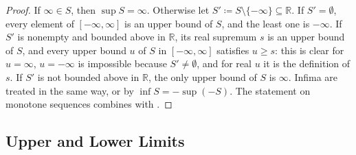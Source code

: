 \begin{proof}
If $\infty\in S$, then $\sup S=\infty$. Otherwise let $S'\coloneqq S\setminus\{-\infty\}\subseteq\mathbb R$. If $S'=\emptyset$, every element of $[-\infty,\infty]$ is an upper bound of $S$, and the least one is $-\infty$. If $S'$ is nonempty and bounded above in $\mathbb R$, its real supremum $s$ is an upper bound of $S$, and every upper bound $u$ of $S$ in $[-\infty,\infty]$ satisfies $u\ge s$: this is clear for $u=\infty$, $u=-\infty$ is impossible because $S'\ne\emptyset$, and for real $u$ it is the definition of $s$. If $S'$ is not bounded above in $\mathbb R$, the only upper bound of $S$ is $\infty$. Infima are treated in the same way, or by $\inf S=-\sup(-S)$. The statement on monotone sequences combines  with .
\end{proof}

\subsection{Upper and Lower Limits}

